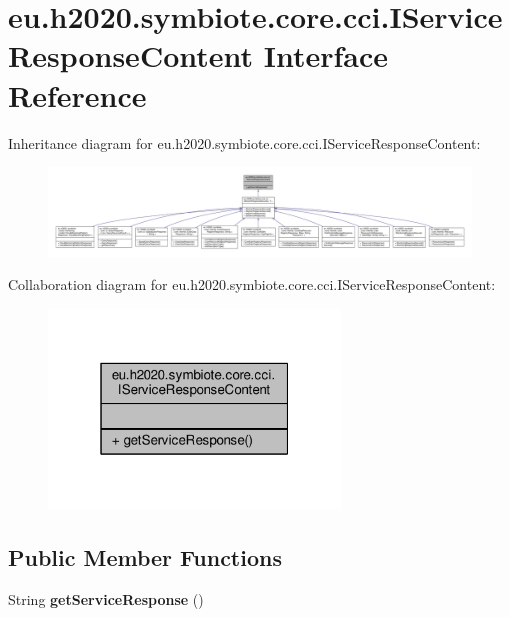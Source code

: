 \hypertarget{interfaceeu_1_1h2020_1_1symbiote_1_1core_1_1cci_1_1IServiceResponseContent}{}\section{eu.\+h2020.\+symbiote.\+core.\+cci.\+I\+Service\+Response\+Content Interface Reference}
\label{interfaceeu_1_1h2020_1_1symbiote_1_1core_1_1cci_1_1IServiceResponseContent}


Inheritance diagram for eu.\+h2020.\+symbiote.\+core.\+cci.\+I\+Service\+Response\+Content\+:\nopagebreak
\begin{figure}[H]
\begin{center}
\leavevmode
\includegraphics[width=350pt]{interfaceeu_1_1h2020_1_1symbiote_1_1core_1_1cci_1_1IServiceResponseContent__inherit__graph}
\end{center}
\end{figure}


Collaboration diagram for eu.\+h2020.\+symbiote.\+core.\+cci.\+I\+Service\+Response\+Content\+:\nopagebreak
\begin{figure}[H]
\begin{center}
\leavevmode
\includegraphics[width=220pt]{interfaceeu_1_1h2020_1_1symbiote_1_1core_1_1cci_1_1IServiceResponseContent__coll__graph}
\end{center}
\end{figure}
\subsection*{Public Member Functions}
\begin{DoxyCompactItemize}
\item 
\mbox{\label{interfaceeu_1_1h2020_1_1symbiote_1_1core_1_1cci_1_1IServiceResponseContent_aaef40b6a9a92e8a52eb58bb1b21cf1c4}} 
String {\bfseries get\+Service\+Response} ()
\end{DoxyCompactItemize}


